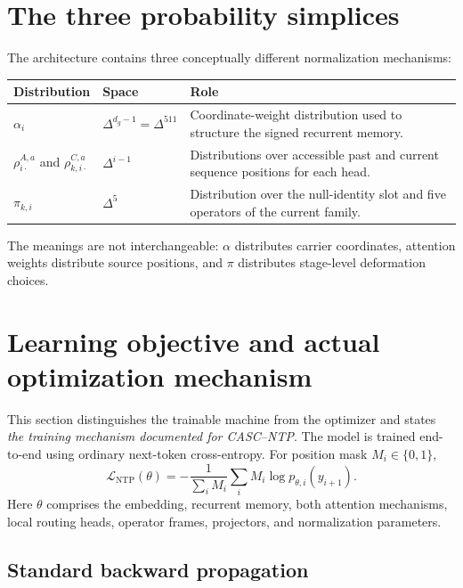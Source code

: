 \documentclass[11pt,a4paper]{article}
\begin{document}
\section{The three probability simplices}

The architecture contains three conceptually different normalization mechanisms:
\begin{center}
\begin{tabular}{p{}p{}p{}}
\toprule
Distribution & Space & Role\\
\midrule
$\alpha_i$ & $\Delta^{d_g-1}=\Delta^{511}$ & Coordinate-weight distribution used to structure the signed recurrent memory.\\
$\rho_{i\cdot}^{A,a}$ and $\rho_{k,i\cdot}^{C,a}$ & $\Delta^{i-1}$ & Distributions over accessible past and current sequence positions for each head.\\
$\pi_{k,i}$ & $\Delta^{5}$ & Distribution over the null-identity slot and five operators of the current family.\\
\bottomrule
\end{tabular}
\end{center}
The meanings are not interchangeable: $\alpha$ distributes carrier coordinates, attention weights
distribute source positions, and $\pi$ distributes stage-level deformation choices.

\section{Learning objective and actual optimization mechanism}

This section distinguishes the trainable machine from the optimizer and states \emph{the training
mechanism documented for CASC--NTP}. The model is trained end-to-end using ordinary next-token
cross-entropy. For position mask $M_i\in\{0,1\}$,
\begin{equation}
\boxed{\mathcal L_{\mathrm{NTP}}(\theta)=-\frac{1}{\sum_iM_i}\sum_iM_i\log p_{\theta,i}(y_{i+1}).}
\end{equation}
Here $\theta$ comprises the embedding, recurrent memory, both attention mechanisms, local routing heads,
operator frames, projectors, and normalization parameters.

\subsection{Standard backward propagation}
\end{document}
